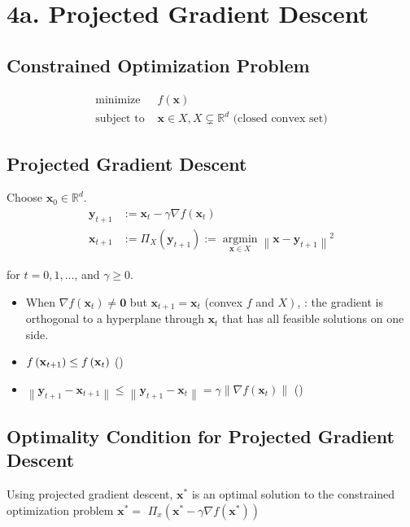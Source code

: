 \section*{4a. Projected Gradient Descent}
\subsection*{Constrained Optimization Problem}
$$
\begin{aligned}
\text { minimize } & f(\mathbf{x}) \\
\text { subject to } & \mathbf{x} \in X, X \subsetneq \mathbb{R}^{d} \text { (closed convex set) }
\end{aligned}
$$

\subsection*{Projected Gradient Descent}
Choose $\mathbf{x}_{0} \in \mathbb{R}^{d}$.
$$
\begin{aligned}
\mathbf{y}_{t+1} &:=\mathbf{x}_{t}-\gamma \nabla f\left(\mathbf{x}_{t}\right) \\
\mathbf{x}_{t+1} &:=\Pi_{X}\left(\mathbf{y}_{t+1}\right):=\underset{\mathbf{x} \in X}{\operatorname{argmin}}\left\|\mathbf{x}-\mathbf{y}_{t+1}\right\|^{2}
\end{aligned}
$$

for  $t=0,1, \ldots$, and  $\gamma \geq 0$.


\begin{itemize}[leftmargin=*]
    \item When $\nabla f\left(\mathbf{x}_{t}\right) \neq \mathbf{0}$ but $\mathbf{x}_{t+1}=\mathbf{x}_{t}$ (convex $f$ and $\left.X\right)$, : the gradient is orthogonal to a hyperplane through $\mathbf{x}_{t}$ that has all feasible solutions on one side.
    \item $f\left(\operatorname{\boldsymbol{\mathbf{x}}}_{t+1}\right) \leq f\left(\operatorname{\boldsymbol{\mathbf{x}}}_{t}\right)$ ()
    \item $\left\|\mathbf{y}_{{t}+1}-\mathbf{x}_{{t}+1}\right\| \leq\left\|\mathbf{y}_{{t}+1}-\mathbf{x}_{{t}}\right\|=\gamma\left\|\nabla {f}\left(\mathbf{x}_{{t}}\right)\right\|$ ()
\end{itemize}



\subsection*{Optimality Condition for Projected Gradient Descent}
Using projected gradient descent, $\mathbf{x}^{*}$ is an optimal solution to the constrained optimization problem  $\mathbf{x}^{*}=$ $\Pi_{x}\left(\mathbf{x}^{*}-\gamma \nabla f\left(\mathbf{x}^{*}\right)\right)$


